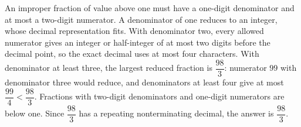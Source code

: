 An improper fraction of value above one must have a one-digit denominator and at most a two-digit numerator. A denominator of one reduces to an integer, whose decimal representation fits. With denominator two, every allowed numerator gives an integer or half-integer of at most two digits before the decimal point, so the exact decimal uses at most four characters. With denominator at least three, the largest reduced fraction is $\dfrac{98}{3}$: numerator $99$ with denominator three would reduce, and denominators at least four give at most $\dfrac{99}{4}<\dfrac{98}{3}$. Fractions with two-digit denominators and one-digit numerators are below one. Since $\dfrac{98}{3}$ has a repeating nonterminating decimal, the answer is $\boxed{\dfrac{98}{3}}$.
